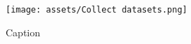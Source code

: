 \begin{figure}
    \centering
    \texttt{[image: assets/Collect datasets.png]}
    \caption{Caption}
    \label{fig:pipeline}
\end{figure}